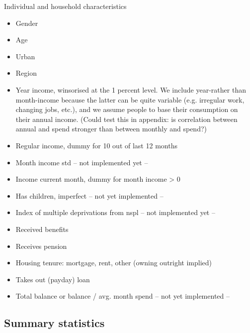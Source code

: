 Individual and household characteristics
\begin{itemize}
    \item Gender

    \item Age

    \item Urban

    \item Region

    \item Year income, winsorised at the 1 percent level. We include
        year-rather than month-income because the latter can be quite variable
        (e.g. irregular work, changing jobs, etc.), and we assume people to
        base their consumption on their annual income. (Could test this in
        appendix: is correlation between annual and spend stronger than between
        monthly and spend?)


    \item Regular income, dummy for 10 out of last 12 months

    \item Month income std -- not implemented yet --

    \item Income current month, dummy for month income > 0

    \item Has children, imperfect -- not yet implemented --

    \item Index of multiple deprivations from nspl -- not implemented yet --

    \item Received benefits

    \item Receives pension

    \item Housing tenure: mortgage, rent, other (owning outright implied)

    \item Takes out (payday) loan

    \item Total balance or balance / avg. month spend -- not yet implemented --
\end{itemize}




\subsection{Summary statistics}%
\label{par:summary_statistics}

